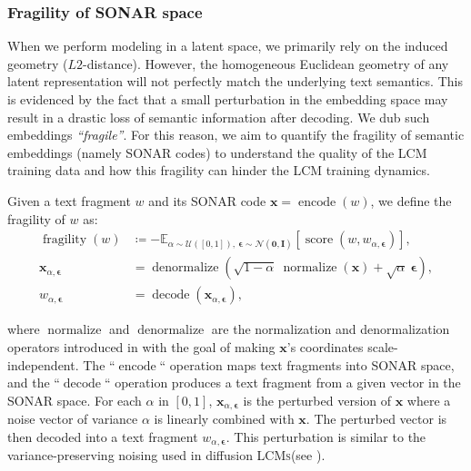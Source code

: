 \documentclass[twoside,11pt]{fairmeta}
\newcommand{\sonar}{\textsc{SONAR}\xspace}
\newcommand{\lcm}{\textsc{LCM}\xspace}
\newcommand{\lcms}{\textsc{LCMs}\xspace}
\DeclareMathOperator{\normalize}{normalize}
\DeclareMathOperator{\denormalize}{denormalize}
\DeclareMathOperator{\encode}{encode}
\DeclareMathOperator{\decode}{decode}
\DeclareMathOperator{\simil}{score}
\DeclareMathOperator{\fragility}{fragility}
\newcommand{\defeq}{\coloneqq}
\newcommand{\ds}{\displaystyle}
\newcommand{\gaussian}{\mathcal{N}}
\newcommand{\uniform}{\mathcal{U}}
\def\rvepsilon{{\bm{\epsilon}}}
\def\rvx{{\mathbf{x}}}
\def\rvzero{{\mathbf{0}}}
\def\rmI{{\mathbf{I}}}
\begin{document}
\subsubsection{Fragility of \sonar space}
\label{sec:analysis:fragility}

When we perform modeling in a latent space, we primarily rely on the induced geometry ($L2$-distance).
However, the homogeneous Euclidean geometry of any latent representation will not perfectly match the underlying text semantics. %
This is evidenced by the fact that 
a small perturbation in the embedding space may result in a drastic loss of semantic information after decoding.
We dub such embeddings \emph{``fragile''}.
For this reason, we aim to quantify the fragility of semantic embeddings (namely \sonar codes) to understand the quality of the \lcm training data and how this fragility can hinder the \lcm training dynamics.

Given a text fragment $w$ and its \sonar code $\rvx = \encode(w)$, we define the fragility of $w$ as:
\begin{align}
\fragility(w) & \defeq - \ds \mathbb{E}_{\alpha \sim \uniform([0, 1]),\ \rvepsilon \sim \gaussian(\rvzero, \rmI)} \left[ \simil(w, w_{\alpha, \rvepsilon}) \right],\label{eqn:fragility:score}\\
\rvx_{\alpha, \rvepsilon} & = \denormalize\left(\sqrt{1 - \alpha} ~ \normalize(\rvx) + \sqrt{\alpha} ~ \rvepsilon\right),\label{eqn:fragility:noised-sample}\\
w_{\alpha, \rvepsilon} & = \decode(\rvx_{\alpha, \rvepsilon}),
\end{align}

where $\normalize$ and $\denormalize$ are the normalization and denormalization operators introduced in  with the goal of making $\rvx$'s coordinates scale-independent.
The ``$\encode$`` operation maps text fragments into \sonar space, and the ``$\decode$`` operation produces a text fragment from a given vector in the \sonar space.
For each $\alpha$ in $[0, 1]$, $\rvx_{\alpha, \rvepsilon}$ is the perturbed version of $\rvx$ where a noise vector of variance $\alpha$ is linearly combined with $\rvx$. The perturbed vector is then decoded into a text fragment $w_{\alpha, \rvepsilon}$.
This perturbation is similar to the variance-preserving noising used in diffusion \lcms (see ).
\end{document}
